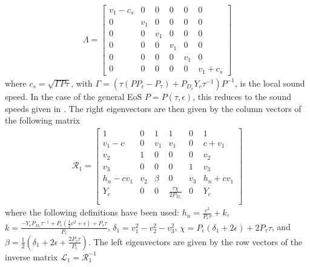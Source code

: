 \documentclass[onecolumn]{aastex62}
\begin{document}
\begin{align}
\Lambda =
\begin{bmatrix}
  v_{1} - c_{s} & 0 & 0& 0& 0& 0 \\
  0 & v_{1} & 0 & 0 & 0 & 0      \\
  0 & 0 & v_{1} & 0 & 0 & 0      \\
  0 & 0 & 0 & v_{1} & 0 & 0      \\
  0 & 0 & 0 & 0 & v_{1} & 0      \\
  0 & 0 & 0 & 0 & 0 & v_{1} + c_{s}
\end{bmatrix}
\end{align}
where $c_{s} = \sqrt{\Gamma P \tau}$, with
$\Gamma = \left(\tau (P P_{\epsilon} - P_{\tau}) + P_{D_e} Y_{e} \tau^{-1}\right) P^{-1}$, is
the local sound speed. In the case of the general EoS $P=P(\tau,\epsilon)$,
this reduces to the sound speeds given in \citet{colella:1985}.
The right eigenvectors are then given by the column vectors of the following matrix
\begin{align*}
  \mathcal{R}_{1} =
  \left[
  \begin{array}{cccccc}
   1 & 0 & 1 & 1 & 0 & 1 \\
   v_{1}-c & 0 & v_{1} & v_{1} & 0 & c+v_{1} \\
   v_{2} & 1 & 0 & 0 & 0 & v_{2} \\
   v_{3} & 0 & 0 & 0 & 1 & v_{3} \\
   h_{n}-c v_{1} & v_{2} & \beta & 0 & v_{3} & h_{n}+c v_{1} \\
   Y_{e}  & 0 & 0 & \frac{\tau  \chi }{2 P_{D_{e}}} & 0 & Y_{e}  \\
  \end{array}
  \right]
\end{align*}
where the following definitions have been used:
$h_{n} = \frac{c^2}{P_{\epsilon}\tau} + k $, $k = \frac{-Y_{e} P_{D_{e}} \tau^{-1}
+ P_{\epsilon} (\frac{1}{2}v^2 + \epsilon) + P_{\tau}\tau}{P_{\epsilon}}$,
$\delta_{1} = v_{1}^{2}-v_{2}^{2}-v_{3}^{2}$,
$\chi = P_{\epsilon} ( \delta_{1} + 2\epsilon) + 2P_{\tau}\tau$, and
$\beta = \frac{1}{2} (\delta_{1}+2 \epsilon +\frac{2 P_{\tau} \tau }{P_{\epsilon}})$.
The left eigenvectors are given by the row vectors of the inverse matrix $\mathcal{L}_{1} = \mathcal{R}_{1}^{-1}$
\end{document}
